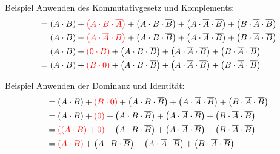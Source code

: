\documentclass[12pt%
,aspectratio=169%
]{beamer}
\begin{document}
\begin{frame}{Beispiel}
Anwenden des Kommutativgesetz und Komplements:
\begin{align*}
&= \left(A \cdot B\right) + \textcolor{red}{\left(A \cdot B \cdot \overline{A}\right)} + \left(A \cdot B \cdot \overline{B}\right) + \left(A \cdot \overline{A} \cdot \overline{B}\right) + \left(B \cdot \overline{A} \cdot \overline{B}\right) \\
&= \left(A \cdot B\right) + \textcolor{red}{\left(A \cdot \overline{A} \cdot B\right)} + \left(A \cdot B \cdot \overline{B}\right) + \left(A \cdot \overline{A} \cdot \overline{B}\right) + \left(B \cdot \overline{A} \cdot \overline{B}\right)\\
&= \left(A \cdot B\right) + \textcolor{red}{\left(0 \cdot B\right)} + \left(A \cdot B \cdot \overline{B}\right) + \left(A \cdot \overline{A} \cdot \overline{B}\right) + \left(B \cdot \overline{A} \cdot \overline{B}\right)\\
& = \left(A \cdot B\right) + \textcolor{red}{\left(B \cdot 0\right)} + \left(A \cdot B \cdot \overline{B}\right) + \left(A \cdot \overline{A} \cdot \overline{B}\right) + \left(B \cdot \overline{A} \cdot \overline{B}\right)
\end{align*}
\end{frame}

\begin{frame}{Beispiel}
Anwenden der Dominanz und Identität:
\begin{align*}
&= \left(A \cdot B\right) + \textcolor{red}{\left(B \cdot 0\right)} + \left(A \cdot B \cdot \overline{B}\right) + \left(A \cdot \overline{A} \cdot \overline{B}\right) + \left(B \cdot \overline{A} \cdot \overline{B}\right)\\
&= \left(A \cdot B\right) + \textcolor{red}{\left(0\right)} + \left(A \cdot B \cdot \overline{B}\right) + \left(A \cdot \overline{A} \cdot \overline{B}\right) + \left(B \cdot \overline{A} \cdot \overline{B}\right)\\
&= \textcolor{red}{\left(\left(A \cdot B\right) + 0\right)} + \left(A \cdot B \cdot \overline{B}\right) + \left(A \cdot \overline{A} \cdot \overline{B}\right) + \left(B \cdot \overline{A} \cdot \overline{B}\right)\\
&= \textcolor{red}{\left(A \cdot B\right)} + \left(A \cdot B \cdot \overline{B}\right) + \left(A \cdot \overline{A} \cdot \overline{B}\right) + \left(B \cdot \overline{A} \cdot \overline{B}\right)
\end{align*}
\end{frame}
\end{document}
